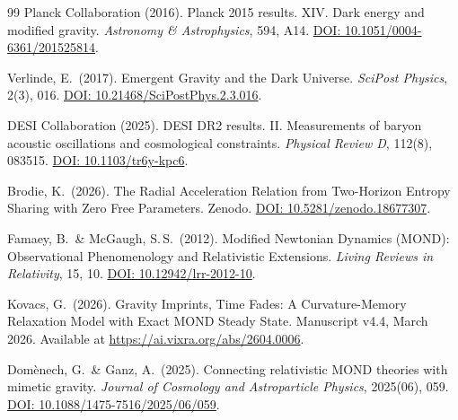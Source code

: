 \documentclass[aps,prd,twocolumn,superscriptaddress,nofootinbib]{revtex4-2}
\begin{document}
\begin{thebibliography}{99}
Planck Collaboration (2016).
Planck 2015 results. XIV. Dark energy and modified gravity.
\textit{Astronomy \& Astrophysics}, 594, A14.
\href{https://doi.org/10.1051/0004-6361/201525814}{DOI: 10.1051/0004-6361/201525814}.

Verlinde, E.\ (2017).
Emergent Gravity and the Dark Universe.
\textit{SciPost Physics}, 2(3), 016.
\href{https://doi.org/10.21468/SciPostPhys.2.3.016}{DOI: 10.21468/SciPostPhys.2.3.016}.

DESI Collaboration (2025).
DESI DR2 results. II. Measurements of baryon acoustic oscillations and cosmological constraints.
\textit{Physical Review D}, 112(8), 083515.
\href{https://doi.org/10.1103/tr6y-kpc6}{DOI: 10.1103/tr6y-kpc6}.

Brodie, K.\ (2026).
The Radial Acceleration Relation from Two-Horizon Entropy Sharing with Zero Free Parameters.
Zenodo. \href{https://doi.org/10.5281/zenodo.18677307}{DOI: 10.5281/zenodo.18677307}.

Famaey, B.\ \& McGaugh, S.\,S.\ (2012).
Modified Newtonian Dynamics (MOND): Observational Phenomenology and Relativistic Extensions.
\textit{Living Reviews in Relativity}, 15, 10.
\href{https://doi.org/10.12942/lrr-2012-10}{DOI: 10.12942/lrr-2012-10}.

Kovacs, G.\ (2026).
Gravity Imprints, Time Fades: A Curvature-Memory Relaxation Model with Exact MOND Steady State.
Manuscript v4.4, March 2026.
Available at \url{https://ai.vixra.org/abs/2604.0006}.

Dom\`enech, G.\ \& Ganz, A.\ (2025).
Connecting relativistic MOND theories with mimetic gravity.
\textit{Journal of Cosmology and Astroparticle Physics}, 2025(06), 059.
\href{https://doi.org/10.1088/1475-7516/2025/06/059}{DOI: 10.1088/1475-7516/2025/06/059}.

\end{thebibliography}
\end{document}
